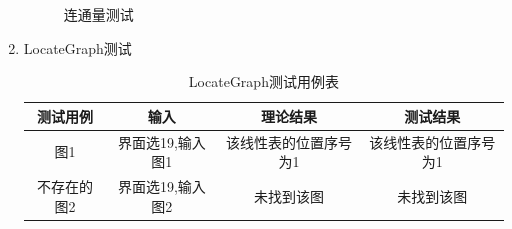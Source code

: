 \documentclass[supercite]{HustGraduPaper}
\theoremstyle{definition}
\begin{document}
\begin{enumerate}
\begin{figure}[htb]
		      \caption{连通量测试}
	      \end{figure}
	      \newpage
	\item LocateGraph测试
	      \begin{table}[htb]
		      \begin{center}
			      \setlength{\tabcolsep}{2.0mm}
			      \caption{LocateGraph测试用例表}
			      \label{t16}
			      \begin{tabular}{|c|c|c|c|}
				      \hline
				      测试用例    & 输入             & 理论结果              & 测试结果              \\
				      \hline
				      \hline
				      图1         & 界面选19,输入图1 & 该线性表的位置序号为1 & 该线性表的位置序号为1 \\
				      \hline
				      不存在的图2 & 界面选19,输入图2 & 未找到该图            & 未找到该图            \\
				      \hline
			      \end{tabular}
		      \end{center}
	      \end{table}
	      \begin{figure}[htb]
		      \centering
		      \quad
		      \\

\end{figure}
\end{enumerate}
\end{document}
